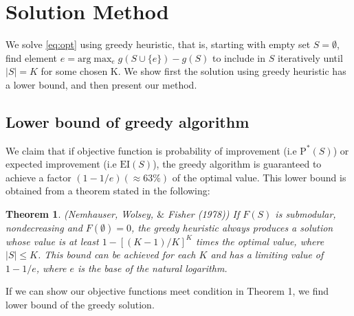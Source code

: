\documentclass[12pt]{article}
\newcommand{\E}{\mathbb{E}}
\newcommand{\EI}{\mathrm{EI}}
\newcommand{\PI}{\text{P}^*}
\newtheorem{thm}{Theorem}
\begin{document}
\section{Solution Method}
We solve \eqref{eq:opt} using greedy heuristic, that is, starting with empty set $S=\emptyset$, find element $e = \mathrm{arg}\max_e g(S \cup \{e\})-g(S)$ to include in $S$ iteratively until $|S|=K$ for some chosen K. We show first the solution using greedy heuristic has a lower bound, and then present our method.
\subsection{Lower bound of greedy algorithm}
We claim that if objective function is probability of improvement (i.e $\PI(S)$) or expected improvement (i.e $\EI(S)$), the greedy algorithm is guaranteed to achieve a factor $(1-1/e) (\approx 63\%)$ of the optimal value. This lower bound is obtained from a theorem stated in the following:

\begin{thm} (Nemhauser, Wolsey, $\&$ Fisher (1978))
If $F(S)$ is submodular, nondecreasing and $F(\emptyset)=0$, the greedy heuristic always produces a solution whose value is at least $1-[(K-1)/K]^K$ times the optimal value, where $|S| \leq K$. This bound can be achieved for each $K$ and has a limiting value of $1-1/e$, where $e$ is the base of the natural logarithm.
\end{thm}

If we can show our objective functions meet condition in Theorem 1, we find lower bound of the greedy solution.
\end{document}
